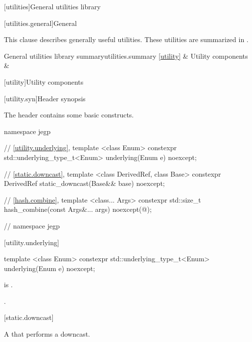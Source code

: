 [utilities]{General utilities library}

[utilities.general]{General}

\pnum
This clause describes generally useful utilities.
These utilities are summarized in .

\begin{libsumtab}{General utilities library summary}{utilities.summary}
\ref{utility}       & Utility components        &     \\
\end{libsumtab}

[utility]{Utility components}

[utility.syn]{Header  synopsis}

\pnum
The header 
contains some basic constructs.

%
\begin{codeblock}
namespace jegp
{
// \ref{utility.underlying}, 
template <class Enum>
constexpr std::underlying_type_t<Enum> underlying(Enum e) noexcept;

// \ref{static.downcast}, 
template <class DerivedRef, class Base>
constexpr DerivedRef static_downcast(Base&& base) noexcept;

// \ref{hash.combine}, 
template <class... Args>
constexpr std::size_t hash_combine(const Args&... args) noexcept(@\seebelow@);

} // namespace jegp
\end{codeblock}

[utility.underlying]{}

%
\begin{itemdecl}
template <class Enum>
constexpr std::underlying_type_t<Enum> underlying(Enum e) noexcept;
\end{itemdecl}

\begin{itemdescr}
\pnum
\constraints
{} is .

\pnum
\returns
{}.
\end{itemdescr}

[static.downcast]{}

\pnum
A  that performs a downcast.

